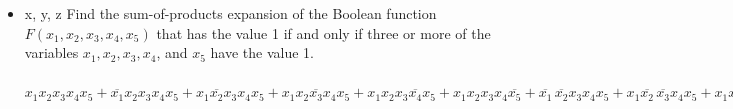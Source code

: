 \begin{itemize}
    \item[6.]  x, y,  z  Find the sum-of-products expansion of the
          Boolean function $F(x_1 , x_2 , x_3 , x_4, x_5)$ that has the value 1
          if and only if three or more of the variables
          $x_1 , x_2 , x_3, x_4$, and $x_5$ have the value 1. \\
          \answer \\
          $x_1 x_2 x_3 x_4 x_5 + \overline{x_1} x_2 x_3 x_4 x_5 + x_1 \overline{x_2} x_3 x_4 x_5 + x_1 x_2 \overline{x_3} x_4 x_5 + x_1 x_2 x_3 \overline{x_4} x_5 + x_1 x_2 x_3 x_4 \overline{x_5} + \overline{x_1}\,\overline{x_2} x_3x_4 x_5 + x_1 \overline{x_2}\,\overline{x_3} x_4 x_5 + x_1 x_2\overline{x_3}\,\overline{x_4}x_5 + x_1 x_2 x_3 \overline{x_4}\,\overline{x_5} + \overline{x_1}x_2 \overline{x_3}x_4 x_5 + \overline{x_1}x_2 x_3 \overline{x_4} x_5  + \overline{x_1}x_2x_3x_4\overline{x_5} + x_1\overline{x_2}x_3\overline{x_4}x_5 + x_1\overline{x_2}x_3x_4\overline{x_5} + x_1x_2\overline{x_3}x_4\overline{x_5}$


\end{itemize}

